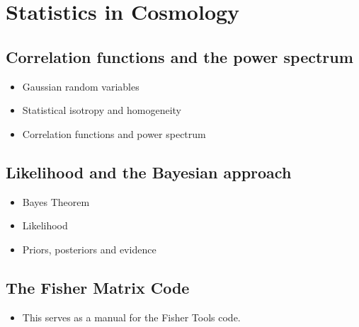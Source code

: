 \chapter{Statistics in Cosmology} %

\label{Statis} %


\section{Correlation functions and the power spectrum }
\begin{itemize}
\item Gaussian random variables
\item Statistical isotropy and homogeneity
\item Correlation functions and power spectrum
\end{itemize}

\section{Likelihood and the Bayesian approach}
\begin{itemize}
\item Bayes Theorem 
\item Likelihood
\item Priors, posteriors and evidence
\end{itemize}



\section{The Fisher Matrix Code}
\begin{itemize}
\item This serves as a manual for the Fisher Tools code.
\end{itemize}


